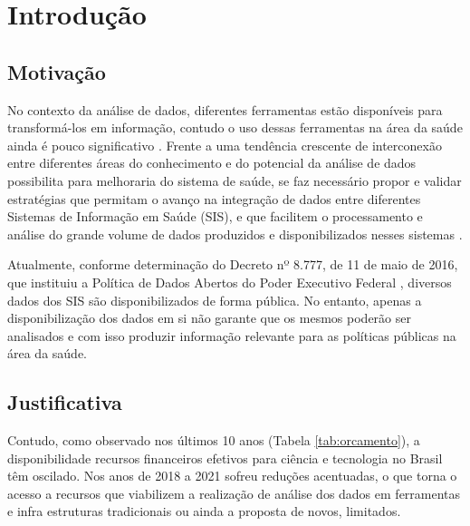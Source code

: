 
\chapter{Introdução}
\label{chap:introducao}

\section{Motivação}
\label{sec:motivacao}

No contexto da análise de dados, diferentes ferramentas estão disponíveis para transformá-los em informação, contudo o uso dessas ferramentas na área da saúde ainda é pouco significativo \cite{galvao_desafios_2019}. Frente a uma tendência crescente de interconexão entre diferentes áreas do conhecimento e do potencial da análise de dados possibilita para melhoraria do sistema de saúde, se faz necessário propor e validar estratégias que permitam o avanço na integração de dados entre diferentes Sistemas de Informação em Saúde (SIS), e que facilitem o processamento e análise do grande volume de dados produzidos e disponibilizados nesses sistemas \cite{galvao_desafios_2019,mehta_concurrence_2018}.

Atualmente, conforme determinação do Decreto nº 8.777, de 11 de maio de 2016, que instituiu a Política de Dados Abertos do Poder Executivo Federal \cite{brasildisponibilidade2016}, diversos dados dos SIS são disponibilizados de forma pública. No entanto, apenas a disponibilização dos dados em si não garante que os mesmos poderão ser analisados e com isso produzir informação relevante para as políticas públicas na área da saúde.

\section{Justificativa}
\label{sec:justificativa}

Contudo, como observado nos últimos 10 anos (Tabela \ref{tab:orcamento}), a disponibilidade recursos financeiros efetivos para ciência e tecnologia no Brasil têm oscilado. Nos anos de 2018 a 2021 sofreu reduções acentuadas, o que torna o acesso a recursos que viabilizem a realização de análise dos dados em ferramentas e infra estruturas tradicionais ou ainda a proposta de novos, limitados.

